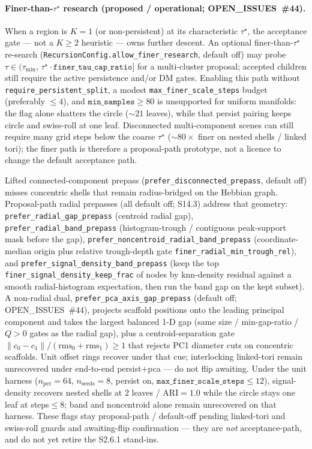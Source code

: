 \documentclass[11pt]{article}
\begin{document}
\paragraph{Finer-than-$\tau^\star$ research (proposed / operational;
OPEN\_ISSUES~\#44).}
When a region is $K{=}1$ (or non-persistent) at its characteristic $\tau^\star$,
the acceptance gate --- not a $K{\ge}2$ heuristic --- owns further descent. An
optional finer-than-$\tau^\star$ re-search
(\texttt{RecursionConfig.allow\_finer\_research}, default off) may probe
$\tau\in(\tau_{\min},\,\tau^\star\cdot\texttt{finer\_tau\_cap\_ratio}]$ for a
multi-cluster proposal; accepted children still require the active persistence
and/or DM gates. Enabling this path without
\texttt{require\_persistent\_split}, a modest
\texttt{max\_finer\_scale\_steps} budget (preferably $\le4$), and
$\texttt{min\_samples}\ge80$ is unsupported for uniform manifolds: the flag
alone shatters the circle ($\sim\!21$ leaves), while that persist pairing keeps
circle and swiss-roll at one leaf. Disconnected multi-component scenes can still
require many grid steps below the coarse $\tau^\star$ ($\sim\!80\times$ finer on
nested shells / linked tori); the finer path is therefore a proposal-path
prototype, not a licence to change the default acceptance path.

Lifted connected-component prepass
(\texttt{prefer\_disconnected\_prepass}, default off) misses concentric shells
that remain radius-bridged on the Hebbian graph. Proposal-path radial prepasses
(all default off; S14.3) address that geometry:
\texttt{prefer\_radial\_gap\_prepass} (centroid radial gap),
\texttt{prefer\_radial\_band\_prepass} (histogram-trough / contiguous peak-support
mask before the gap),
\texttt{prefer\_noncentroid\_radial\_band\_prepass} (coordinate-median origin
plus relative trough-depth gate
\texttt{finer\_radial\_min\_trough\_rel}), and
\texttt{prefer\_signal\_density\_band\_prepass} (keep the top
\texttt{finer\_signal\_density\_keep\_frac} of nodes by knn-density residual
against a smooth radial-histogram expectation, then run the band gap on the
kept subset). A non-radial dual,
\texttt{prefer\_pca\_axis\_gap\_prepass} (default off; OPEN\_ISSUES~\#44),
projects scaffold positions onto the leading principal component and takes the
largest balanced 1-D gap (same size / min-gap-ratio / $Q{>}0$ gates as the
radial gap), plus a centroid-separation gate
$\|c_0-c_1\|/(\mathrm{rms}_0+\mathrm{rms}_1)\ge1$ that rejects PC1 diameter
cuts on concentric scaffolds. Unit offset rings recover under that cue;
interlocking linked-tori remain unrecovered under end-to-end
persist$+$pca --- do not flip awaiting. Under the unit harness
($n_{\mathrm{per}}=64$, $n_{\mathrm{seeds}}=8$, persist on,
$\texttt{max\_finer\_scale\_steps}\le12$), signal-density recovers nested shells
at $2$ leaves / $\mathrm{ARI}{=}1.0$ while the circle stays one leaf at
steps$\le8$; band and noncentroid alone remain unrecovered on that harness.
These flags stay proposal-path / default-off pending linked-tori and swiss-roll
guards and awaiting-flip confirmation --- they are \emph{not} acceptance-path,
and do not yet retire the S2.6.1 stand-ins.
\end{document}
